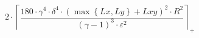 \[2 \cdot \left\lceil \frac{180 \cdot \gamma^{4} \cdot \delta^{4} \cdot \left(\max\left\{ Lx, Ly \right\} + Lxy\right)^{2} \cdot R^{2}}{\left(\gamma - 1\right)^{3} \cdot \varepsilon^{2}} \right\rceil_{+}\]

